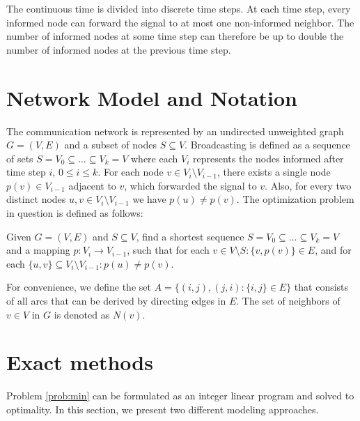 The continuous time is divided into discrete time steps.
At each time step, every informed node can forward the signal to at most one non-informed neighbor.
The number of informed nodes at some time step can therefore be up to double the number of informed nodes at the previous time step.
%
\section{Network Model and Notation}

The communication network is represented by an undirected unweighted graph $G=(V,E)$ and a subset of nodes $S\subseteq V$. 
Broadcasting is defined as a sequence of sets $S=V_0\subseteq\dots\subseteq V_k = V$ where each $V_i$ represents the nodes informed after time step $i$, $0\leq i\leq k$.
For each node $v\in V_i\setminus V_{i-1}$, there exists a single node $p(v)\in V_{i-1}$ adjacent to $v$, which forwarded the signal to $v$.
Also, for every two distinct nodes $u,v\in V_i\setminus V_{i-1}$ we have $p(u)\neq p(v)$.
The optimization problem in question is defined as follows:
\begin{problem}\label{prob:min}
Given $G=(V,E)$ and $S\subseteq V$, find a shortest sequence $S=V_0\subseteq\dots\subseteq V_k=V$ and a mapping $p:V_i\to V_{i-1}$, such that for each $v\in V\setminus S:\{v,p(v)\}\in E$, and for each $\{u,v\}\subseteq V_i\setminus V_{i-1}: p(u)\neq p(v)$.
\end{problem}
For convenience, we define the set $A=\{(i,j),(j,i):\{i,j\}\in E\}$ that consists of all arcs that can be derived by directing edges in $E$.
The set of neighbors of $v\in V$ in $G$ is denoted as $N(v)$.
\section{Exact methods}

Problem \ref{prob:min} can be formulated as an integer linear program and solved to optimality. In this section, we present two different modeling approaches. 

